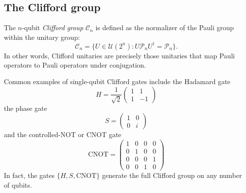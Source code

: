 \subsection{The Clifford group}

The $n$-qubit \emph{Clifford group} $\mathcal{C}_n$ is defined as the normalizer of the Pauli group within the unitary group:
\begin{equation}
    \mathcal{C}_n = \{ U \in \mathcal{U}(2^n) : U \mathcal{P}_n U^\dagger = \mathcal{P}_n \}.
\end{equation}
In other words, Clifford unitaries are precisely those unitaries that map Pauli operators to Pauli operators under conjugation.

Common examples of single-qubit Clifford gates include the Hadamard gate
\begin{equation}
    H = \frac{1}{\sqrt{2}} \begin{pmatrix} 1 & 1 \\ 1 & -1 \end{pmatrix}
\end{equation}
the phase gate
\begin{equation}
    S = \begin{pmatrix} 1 & 0 \\ 0 & i \end{pmatrix}
\end{equation}
and the controlled-NOT or CNOT gate
\begin{equation}
    \text{CNOT} = \begin{pmatrix} 1 & 0 & 0 & 0 \\ 0 & 1 & 0 & 0 \\ 0 & 0 & 0 & 1 \\ 0 & 0 & 1 & 0 \end{pmatrix}
\end{equation}
In fact, the gates $\{H, S, \text{CNOT}\}$ generate the full Clifford group on any number of qubits.
